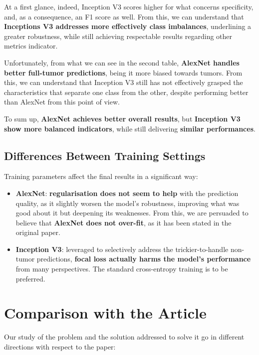 \par
At a first glance, indeed, Inception V3 scores higher for what concerns specificity, and, as a consequence, an F1 score as well. From this, we can understand that \textbf{Inceptions V3 addresses more effectively class imbalances}, underlining a greater robustness, while still achieving respectable results regarding other metrics indicator.

\par
Unfortunately, from what we can see in the second table, \textbf{AlexNet handles better full-tumor predictions}, being it more biased towards tumors. From this, we can understand that Inception V3 still has not effectively grasped the characteristics that separate one class from the other, despite performing better than AlexNet from this point of view.

\par To sum up, \textbf{AlexNet achieves better overall results}, but \textbf{Inception V3 show more balanced indicators}, while still delivering \textbf{similar performances}.

\subsection{Differences Between Training Settings}

Training parameters affect the final results in a significant way:

\begin{itemize}
    \item \textbf{AlexNet}: \textbf{regularisation does not seem to help} with the prediction quality, as it slightly worsen the model's robustness, improving what was good about it but deepening its weaknesses. From this, we are persuaded to believe that \textbf{AlexNet does not over-fit}, as it has been stated in the original paper.

    \item \textbf{Inception V3}: leveraged to selectively address the trickier-to-handle non-tumor predictions, \textbf{focal loss actually harms the model's performance} from many perspectives. The standard cross-entropy training is to be preferred.
\end{itemize}

\section{Comparison with the Article}

Our study of the problem and the solution addressed to solve it go in different directions with respect to the paper:

